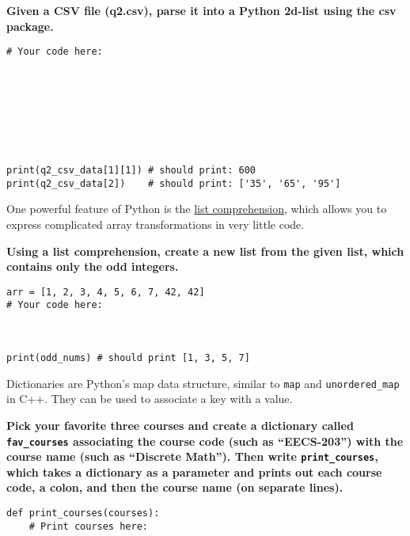 \documentclass{article}
\begin{document}
\begin{enumerate}
\begin{minipage}{\textwidth}
    \textbf{Given a CSV file (q2.csv), parse it into a Python 2d-list using the csv package.}
  
  \begin{lstlisting}[style=Python]
# Your code here:








print(q2_csv_data[1][1]) # should print: 600
print(q2_csv_data[2])    # should print: ['35', '65', '95']
    \end{lstlisting}
\end{minipage}

\begin{minipage}{\textwidth}
    \item One powerful feature of Python is the \href{https://docs.python.org/2/tutorial/datastructures.html#list-comprehensions}{list comprehension}, which allows you to express complicated array transformations in very little code.
  
    \textbf{Using a list comprehension, create a new list from the given list, which contains only the odd integers.}
  
  \begin{lstlisting}[style=Python]
arr = [1, 2, 3, 4, 5, 6, 7, 42, 42]
# Your code here:



print(odd_nums) # should print [1, 3, 5, 7]
    \end{lstlisting}
\end{minipage}

\begin{minipage}{\textwidth}
  \item Dictionaries are Python's map data structure, similar to \texttt{map} and \texttt{unordered\_map} in C++. They can be used to associate a key with a value.
    
\textbf{Pick your favorite three courses and create a dictionary called \texttt{fav\_courses} associating the course code (such as ``EECS-203'') with the course name (such as ``Discrete Math''). Then write \texttt{print\_courses}, which takes a dictionary as a parameter and prints out each course code, a colon, and then the course name (on separate lines).}
  
  \begin{lstlisting}[style=Python]
def print_courses(courses):
    # Print courses here:





\end{lstlisting}
\end{minipage}
\end{enumerate}
\end{document}
